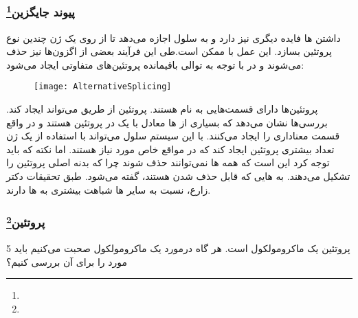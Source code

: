 \pagebreak
\subsubsection{پیوند جایگزین\protect\footnote{}}
داشتن
ها فایده دیگری نیز دارد و به سلول اجازه می‌دهد تا از روی یک ژن چندین نوع پروتئین بسازد. این عمل با
ممکن است.طی این فرآیند بعضی از اگزون‌ها نیز حذف می‌شوند و در با توجه به توالی باقیمانده پروتئین‌های متفاوتی ایجاد می‌شود:

\begin{figure}[htbp]
\centering
\texttt{[image: AlternativeSplicing]}
\caption{}
\end{figure}

پروتئین‌ها دارای قسمت‌هایی به نام
هستند. پروتئین از طریق
می‌تواند
ایجاد کند. بررسی‌ها نشان می‌دهد که بسیاری از
ها معادل با یک
در پروتئین هستند و در واقع قسمت معناداری را ایجاد می‌کنند. با این سیستم سلول می‌تواند با استفاده از یک ژن تعداد بیشتری پرو‌تئین ایجاد کند که در مواقع خاص مورد نیاز هستند. اما نکته که باید توجه کرد این است که همه
ها نمی‌توانند حذف شوند چرا که بدنه اصلی پروتئین را تشکیل می‌دهند. به
هایی که قابل حذف شدن هستند،
گفته می‌شود. طبق تحقیقات دکتر زارع،
نسبت به سایر
ها شباهت بیشتری به
ها دارند.

\pagebreak
\subsubsection{پروتئین\protect\footnote{}}
پروتئین یک ماکرومولکول است. هر گاه درمورد یک ماکرومولکول صحبت می‌کنیم باید 5 مورد را برای آن بررسی کنیم؟

